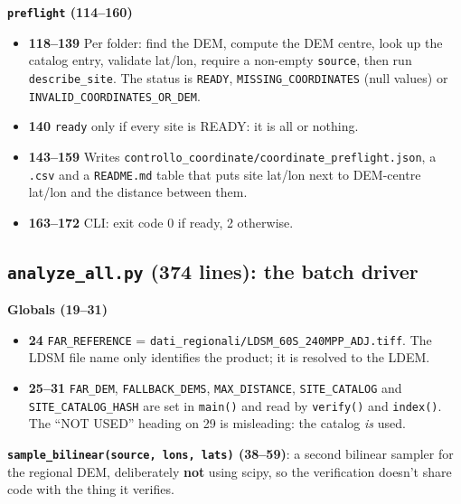 \documentclass[11pt,a4paper]{article}
\providecommand{\tightlist}{\setlength{\itemsep}{0pt}\setlength{\parskip}{0pt}}
\begin{document}
\textbf{\texttt{preflight} (114--160)}

\begin{itemize}
\tightlist
\item
  \textbf{118--139} Per folder: find the DEM, compute the DEM centre,
  look up the catalog entry, validate lat/lon, require a non-empty
  \texttt{source}, then run
  \texttt{describe\_site}. The status is
  \texttt{READY},
  \texttt{MISSING\_COORDINATES} (null values) or
  \texttt{INVALID\_COORDINATES\_OR\_DEM}.
\item
  \textbf{140} \texttt{ready} only if every site is
  READY: it is all or nothing.
\item
  \textbf{143--159} Writes
  \texttt{controllo\_coordinate/coordinate\_preflight.json},
  a \texttt{.csv} and a
  \texttt{README.md} table that puts site lat/lon next
  to DEM-centre lat/lon and the distance between them.
\item
  \textbf{163--172} CLI: exit code 0 if ready, 2 otherwise.
\end{itemize}

\hypertarget{analyze_all.py-374-lines-the-batch-driver}{%
\subsection{\texorpdfstring{\texttt{analyze\_all.py} (374 lines): the
batch
driver}{analyze\_all.py (374 lines): the batch driver}}\label{analyze_all.py-374-lines-the-batch-driver}}

\textbf{Globals (19--31)}

\begin{itemize}
\tightlist
\item
  \textbf{24} \texttt{FAR\_REFERENCE} =
  \texttt{dati\_regionali/LDSM\_60S\_240MPP\_ADJ.tiff}.
  The LDSM file name only identifies the product; it is resolved to the
  LDEM.
\item
  \textbf{25--31} \texttt{FAR\_DEM},
  \texttt{FALLBACK\_DEMS},
  \texttt{MAX\_DISTANCE},
  \texttt{SITE\_CATALOG} and
  \texttt{SITE\_CATALOG\_HASH} are set in
  \texttt{main()} and read by
  \texttt{verify()} and
  \texttt{index()}. The ``NOT USED'' heading on 29 is
  misleading: the catalog \emph{is} used.
\end{itemize}

\textbf{\texttt{sample\_bilinear(source, lons, lats)}
(38--59)}: a second bilinear sampler for the regional DEM, deliberately
\textbf{not} using scipy, so the verification doesn't share code with
the thing it verifies.
\end{document}
